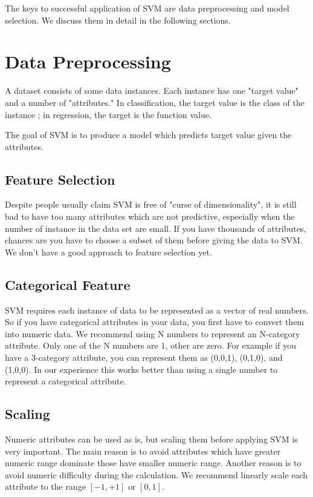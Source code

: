 \documentclass[12pt]{article}
\begin{document}
The keys to successful application of SVM are 
data preprocessing and model selection. 
We discuss them in detail in the following 
sections.

\section{Data Preprocessing}

A dataset consists of some data instances. Each
instance has one "target value" and a number of
"attributes." In classification, the target value 
is the class of the instance ; in regression, 
the target is the function value.

The goal of SVM is to produce a model which 
predicts target value given the attributes.

\subsection{Feature Selection}

Despite people usually claim SVM is free of 
"curse of dimensionality", it is still bad to 
have too many attributes which are not predictive, 
especially when the number of instance in the
data set are small. If you have thousands of
attributes, chances are you have to choose a 
subset of them before giving the data to SVM.
We don't have a good approach to feature 
selection yet.

\subsection{Categorical Feature}

SVM requires each instance of data to be represented
as a vector of real numbers. So if you have categorical
attributes in your data, you first have to convert 
them into numeric data. We recommend using N numbers to 
represent an N-category attribute. Only one of the N
numbers are 1, other are zero. For example if you have
a 3-category attribute, you can represent them as (0,0,1),
(0,1,0), and (1,0,0). In our experience this works
better than using a single number to represent a 
categorical attribute.

\subsection{Scaling}

Numeric attributes can be used as is, but
scaling them before applying SVM is very important.
The main reason is to avoid attributes which have 
greater numeric range dominate those have 
smaller numeric range. Another reason is to 
avoid numeric difficulty during the calculation. 
We recommend linearly scale each attribute to 
the range $[-1,+1]$ or $[0,1]$.
\end{document}
